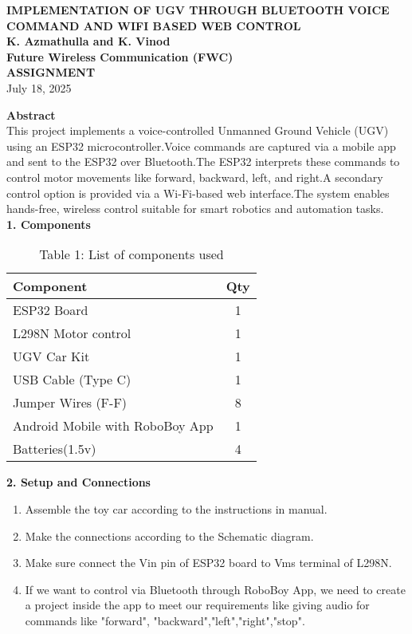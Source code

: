 \documentclass[12pt]{article}
\begin{document}
\begin{center}
    \textbf{\Large IMPLEMENTATION OF UGV THROUGH BLUETOOTH VOICE COMMAND AND WIFI BASED WEB CONTROL} \\[10pt]
    \textbf{K. Azmathulla and K. Vinod} \\
    \textbf{Future Wireless Communication (FWC)} \\
    \textbf{ASSIGNMENT} \\[5pt]
    July 18, 2025
\end{center}
\vspace{1em}

\begin{multicols}{2}

\noindent\textbf{Abstract} \\[0.5em]
\noindent This project implements a voice-controlled Unmanned Ground Vehicle (UGV) using an ESP32 microcontroller.Voice commands are captured via a mobile app and sent to the ESP32 over Bluetooth.The ESP32 interprets these commands to control motor movements like forward, backward, left, and right.A secondary control option is provided via a Wi-Fi-based web interface.The system enables hands-free, wireless control suitable for smart robotics and automation tasks.\\

\vspace{1em}
\noindent\textbf{1. Components}
\begin{table}[H]
\small
\centering
\begin{tabular}{|p{4.2cm}|c|}
\hline
\textbf{Component} & \textbf{Qty} \\
\hline
ESP32  Board & 1 \\
L298N Motor control & 1\\
UGV Car Kit & 1 \\
USB Cable (Type C) & 1 \\
Jumper Wires (F-F) & 8 \\
Android Mobile with RoboBoy App & 1 \\
Batteries(1.5v) & 4\\
\hline
\end{tabular}
\caption*{Table 1: List of components used}
\end{table}

\vspace{1em}
\noindent\textbf{2. Setup and Connections}
\begin{enumerate}
    \item Assemble the toy car according to the instructions in  manual.
    \item Make the connections according to the Schematic diagram.
    \item Make sure connect the Vin pin of ESP32 board to Vms terminal of L298N.
    \item If we want to control via Bluetooth through RoboBoy App, we need to create a project inside the app to meet our requirements like giving audio for commands like  "forward", "backward","left","right","stop".
\end{enumerate}


\end{multicols}
\end{document}
